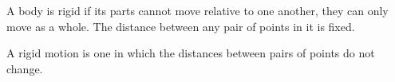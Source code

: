 A body is rigid if its parts cannot move relative to 
one another, they can only move as a whole. The 
distance between any pair of points in it is fixed.
\par
A rigid motion is one in which the distances between
pairs of points do not change.